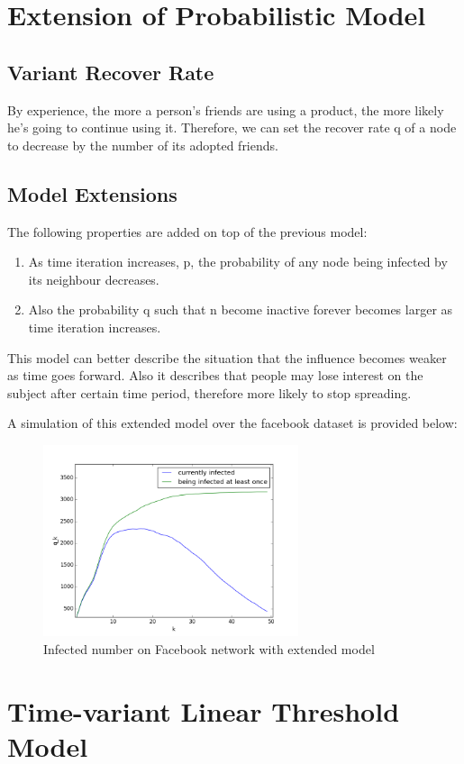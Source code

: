 \documentclass{article}
\begin{document}
\section{Extension of Probabilistic Model}
\subsection{Variant Recover Rate}
By experience, the more a person's friends are using a product, the more likely he's going to continue using it. Therefore, we can set the recover rate q of a node to decrease by the number of its adopted friends.

\subsection{Model Extensions}
The following properties are added on top of the previous model: 
\begin{enumerate}
\item As time iteration increases, p, the probability of any node being infected by its neighbour decreases. 
\item Also the probability q such that n become inactive forever becomes larger as time iteration increases.
\end{enumerate}

This model can better describe the situation that the influence becomes weaker as time goes forward. Also it describes that people may lose interest on the subject after certain time period, therefore more likely to stop spreading. 

A simulation of this extended model over the facebook dataset is provided below:

\begin{figure}[H]
\centering
\includegraphics[width=7.5cm]{plotfb.png}
\caption{Infected number on Facebook network with extended model}
\end{figure}

\section{Time-variant Linear Threshold Model}
\end{document}
